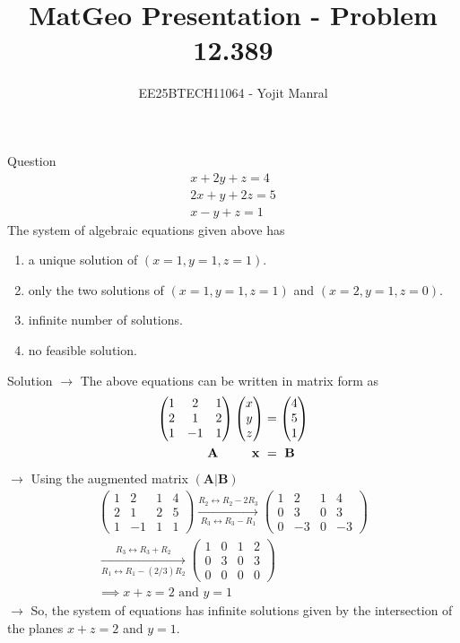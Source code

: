 \documentclass{beamer}
\title{MatGeo Presentation - Problem 12.389}
\author{EE25BTECH11064 - Yojit Manral}
\date{}
\numberwithin{equation}{section}
\providecommand{\brak}[1]{\ensuremath{\left(#1\right)}}
\theoremstyle{remark}
\newcommand{\myvec}[1]{\ensuremath{\begin{pmatrix}#1\end{pmatrix}}}
\let\vec\mathbf
\begin{document}
\frame{\titlepage}
\begin{frame}{Question}
\begin{align*}
    x + 2y + z = 4 \\
    2x + y + 2z = 5 \\
    x - y + z = 1
\end{align*}
The system of algebraic equations given above has
\begin{enumerate}[label=(\alph*)]
    \item a unique solution of $(x = 1, y = 1, z = 1)$.
    \item only the two solutions of $(x = 1, y = 1, z = 1)$ and $(x = 2, y = 1, z = 0)$.
    \item infinite number of solutions.
    \item no feasible solution.
\end{enumerate}
\end{frame}

\begin{frame}{Solution}
$\rightarrow$ The above equations can be written in matrix form as
\begin{align}
    \myvec{1&2&1\\2&1&2\\1&-1&1}\myvec{x\\y\\z} &= \myvec{4\\5\\1} \\
    \vec{A} \hspace{0.95cm} \vec{x} \hspace{0.12cm} &= \hspace{0.12cm} \vec{B}
\end{align}
$\rightarrow$ Using the augmented matrix $\brak{\vec{A}|\vec{B}}$
\begin{align}
    \brak{\begin{array}{ccc|c}1&2&1&4\\2&1&2&5\\1&-1&1&1\end{array}}
    \xrightarrow[R_3 \leftrightarrow R_3 - R_1]{R_2 \leftrightarrow R_2 - 2R_3} \brak{\begin{array}{ccc|c}1&2&1&4\\0&3&0&3\\0&-3&0&-3\end{array}} \\
    \xrightarrow[R_1 \leftrightarrow R_1 - (2/3)R_2]{R_3 \leftrightarrow R_3 + R_2}
    \brak{\begin{array}{ccc|c}1&0&1&2\\0&3&0&3\\0&0&0&0\end{array}} \\
    \implies x + z = 2 \text{ and } y = 1
\end{align}
$\rightarrow$ So, the system of equations has infinite solutions given by the intersection of the planes $x + z = 2$ and $y = 1$. \\
\end{frame}
\end{document}
